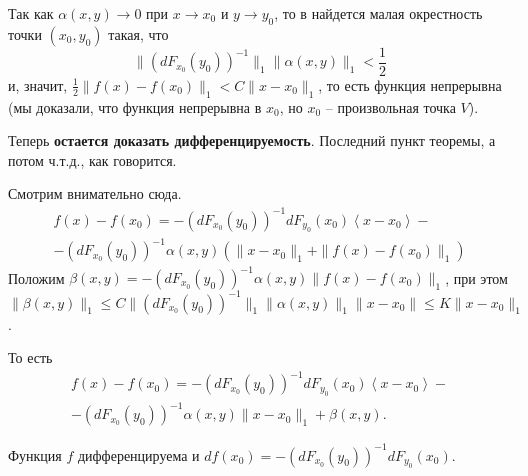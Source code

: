 \begin{Proof}
		Так как $\alpha(x,y)\to0$ при $x\to x_0$ и $y\to y_0$, то в найдется малая окрестность точки $(x_0, y_0)$ такая, что $$\|(dF_{x_0}(y_0))^{-1}\|_1\|\alpha(x,y)\|_1 < \frac 1 2$$ и, значит, 
		$ \frac 1 2 \|f(x)-f(x_0)\|_1 < C \|x-x_0\|_1$, то есть функция непрерывна (мы доказали, что функция непрерывна в $x_0$, но $x_0$ -- произвольная точка $V$).
		
		Теперь \textbf{остается доказать дифференцируемость}. Последний пункт теоремы, а потом ч.т.д., как говорится.
		
		Смотрим внимательно сюда.
		\begin{multline*}
		f(x)-f(x_0) = -(dF_{x_0}(y_0))^{-1}dF_{y_0}(x_0)\left< x-x_0\right> - \\
		-(dF_{x_0}(y_0))^{-1}\alpha(x,y)(\|x-x_0\|_1 + \|f(x)-f(x_0)\|_1)
		\end{multline*}
		Положим $\beta(x,y) = -(dF_{x_0}(y_0))^{-1}\alpha(x,y) \|f(x)-f(x_0)\|_1$, при этом $$\|\beta(x,y)\|_1 \le C \|(dF_{x_0}(y_0))^{-1} \|_1\|\alpha(x,y)\|_1\|x-x_0\| \le K \|x-x_0\|_1$$.
		
		То есть
		\begin{multline*}
		f(x)-f(x_0) = -(dF_{x_0}(y_0))^{-1}dF_{y_0}(x_0)\left< x-x_0\right> -\\
		- (dF_{x_0}(y_0))^{-1}\alpha(x,y)\|x-x_0\|_1 + \beta(x,y).
		\end{multline*}
		
		Функция $f$ дифференцируема и $df(x_0) = -(dF_{x_0}(y_0))^{-1}dF_{y_0}(x_0)$.
	\end{Proof}

